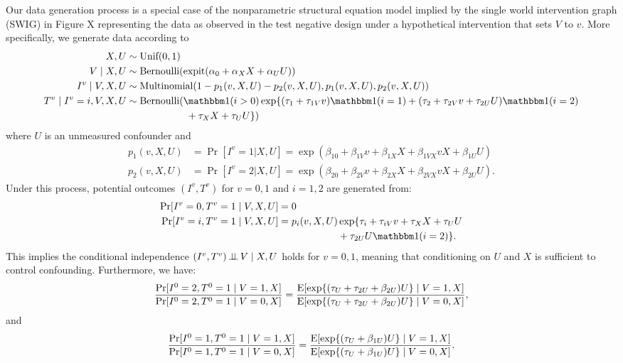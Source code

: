 \begin{appendix}
Our data generation process is a special case of the nonparametric structural equation model implied by the single world intervention graph (SWIG) in Figure X representing the data as observed in the test negative design under a hypothetical intervention that sets $V$ to $v$. More specifically, we generate data according to  
\begin{align*}
    X, U &\sim \text{Unif}(0,1)\\
    V\mid X, U & \sim \text{Bernoulli}(\expit(\alpha_0 + \alpha_X X + \alpha_U U))\\
    I^v \mid V, X, U &\sim \text{Multinomial}(1-p_1(v, X, U) - p_2(v, X, U), p_1(v, X, U), p_2(v, X, U))\\
    T^v\mid I^v=i, V, X, U &\sim \text{Bernoulli}(\mathbbm 1(i>0)\exp\{(\tau_{1} + \tau_{1V}v) \mathbbm 1(i=1) + (\tau_{2} + \tau_{2V} v + \tau_{2U} U ) \mathbbm 1(i=2) \\&\qquad \qquad\qquad + \tau_X X + \tau_U U \})
\end{align*}
where $U$ is an unmeasured confounder and
\begin{align*}
    p_1(v, X, U) & = \Pr[I^v = 1 | X, U] = \exp(\beta_{10} + \beta_{1V}v + \beta_{1X}X + \beta_{1VX}vX + \beta_{1U}U) \\
    p_2(v, X, U) & = \Pr[I^v = 2 | X, U] = \exp(\beta_{20} + \beta_{2V}v + \beta_{2X}X + \beta_{2VX}vX + \beta_{2U}U).
\end{align*}
Under this process, potential outcomes $(I^v, T^v)$ for $v=0,1$ and $i=1, 2$ are generated from:
\begin{align*}
    \Pr[I^v=0, T^v=1\mid V, X, U] &= 0\\
    \Pr[I^v=i, T^v=1\mid V, X, U] &= p_i(v, X, U)\exp\{\tau_i + \tau_{iV} v + \tau_X X + \tau_U U \\&\qquad \qquad\qquad + \tau_{2U}U\mathbbm 1(i=2) \}.
\end{align*}
This implies the conditional independence $(I^v, T^v)\operatorname{\perp\!\!\!\perp} V\mid X, U$ holds for $v=0,1$, meaning that conditioning on $U$ and $X$ is sufficient to control confounding. Furthermore, we have:
\begin{align*}
    \dfrac{\Pr[I^0=2, T^0=1 \mid V=1,X]}{\Pr[I^0=2, T^0=1\mid V=0,X]}=\dfrac{\operatorname{E}[\exp\{(\tau_U  + \tau_{2U}+\beta_{2U})U\}\mid V=1, X]}{\operatorname{E}[\exp\{(\tau_U  + \tau_{2U}+\beta_{2U})U\}\mid V=0, X]},
\end{align*}
and 
\begin{align*}
    \dfrac{\Pr[I^0=1, T^0=1 \mid V=1,X]}{\Pr[I^0=1, T^0=1\mid V=0,X]}=\dfrac{\E[\exp\{(\tau_U  +\beta_{1U})U\}\mid V=1, X]}{\E[\exp\{(\tau_U +\beta_{1U})U\}\mid V=0, X]}.

\end{align*}
\end{appendix}
